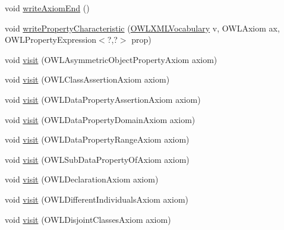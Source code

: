 \begin{DoxyCompactItemize}
\item 
void \hyperlink{classorg_1_1coode_1_1owlapi_1_1functionalrenderer_1_1_o_w_l_object_renderer_a34e269109914105bfdc1f236c5ada341}{write\-Axiom\-End} ()
\item 
void \hyperlink{classorg_1_1coode_1_1owlapi_1_1functionalrenderer_1_1_o_w_l_object_renderer_a5efa17a58eb580f92e65fc937d2d8fbb}{write\-Property\-Characteristic} (\hyperlink{enumorg_1_1semanticweb_1_1owlapi_1_1vocab_1_1_o_w_l_x_m_l_vocabulary}{O\-W\-L\-X\-M\-L\-Vocabulary} v, O\-W\-L\-Axiom ax, O\-W\-L\-Property\-Expression$<$?,?$>$ prop)
\item 
void \hyperlink{classorg_1_1coode_1_1owlapi_1_1functionalrenderer_1_1_o_w_l_object_renderer_af3ca74652856b2e3e337351ff1466bc2}{visit} (O\-W\-L\-Asymmetric\-Object\-Property\-Axiom axiom)
\item 
void \hyperlink{classorg_1_1coode_1_1owlapi_1_1functionalrenderer_1_1_o_w_l_object_renderer_aa48da784a40f3302d739b4748ae7218c}{visit} (O\-W\-L\-Class\-Assertion\-Axiom axiom)
\item 
void \hyperlink{classorg_1_1coode_1_1owlapi_1_1functionalrenderer_1_1_o_w_l_object_renderer_a95e3171fb705c16874686c1d714608f0}{visit} (O\-W\-L\-Data\-Property\-Assertion\-Axiom axiom)
\item 
void \hyperlink{classorg_1_1coode_1_1owlapi_1_1functionalrenderer_1_1_o_w_l_object_renderer_a494b056f71338f654030f4fd43f00da5}{visit} (O\-W\-L\-Data\-Property\-Domain\-Axiom axiom)
\item 
void \hyperlink{classorg_1_1coode_1_1owlapi_1_1functionalrenderer_1_1_o_w_l_object_renderer_a1d8806d4de8331c85d497b2b056edd3a}{visit} (O\-W\-L\-Data\-Property\-Range\-Axiom axiom)
\item 
void \hyperlink{classorg_1_1coode_1_1owlapi_1_1functionalrenderer_1_1_o_w_l_object_renderer_a4b462790e5378320b0e0e2652a223d35}{visit} (O\-W\-L\-Sub\-Data\-Property\-Of\-Axiom axiom)
\item 
void \hyperlink{classorg_1_1coode_1_1owlapi_1_1functionalrenderer_1_1_o_w_l_object_renderer_a3532f1e61fd2656335bf81e49b188c01}{visit} (O\-W\-L\-Declaration\-Axiom axiom)
\item 
void \hyperlink{classorg_1_1coode_1_1owlapi_1_1functionalrenderer_1_1_o_w_l_object_renderer_afbb7141c892234cf7e5e2e6b5b1c2365}{visit} (O\-W\-L\-Different\-Individuals\-Axiom axiom)
\item 
void \hyperlink{classorg_1_1coode_1_1owlapi_1_1functionalrenderer_1_1_o_w_l_object_renderer_ab70c32f83d1caeb4c7398c1b461cdeec}{visit} (O\-W\-L\-Disjoint\-Classes\-Axiom axiom)

\end{DoxyCompactItemize}
